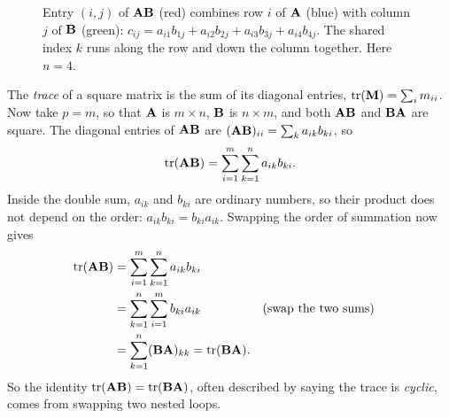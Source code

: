 \begin{figure}[htbp]
\centering
{}
\caption{Entry $(i,j)$ of $\mathbf{A}\mathbf{B}$ (red) combines row $i$ of $\mathbf{A}$ (blue) with column
$j$ of $\mathbf{B}$ (green): $c_{ij} = a_{i1}b_{1j} + a_{i2}b_{2j} + a_{i3}b_{3j} + a_{i4}b_{4j}$. The
shared index $k$ runs along the row and down the column together. Here $n = 4$.}
\label{ch39:fig-matmul}
\end{figure}

The \emph{trace} of a square matrix is the sum of its diagonal entries, $\operatorname{tr}(\mathbf{M}) = \sum_{i}
m_{ii}$. Now take $p = m$, so that $\mathbf{A}$ is $m\times n$, $\mathbf{B}$ is $n\times m$, and both
$\mathbf{A}\mathbf{B}$ and $\mathbf{B}\mathbf{A}$ are square. The diagonal entries of $\mathbf{A}\mathbf{B}$ are
$(\mathbf{A}\mathbf{B})_{ii} = \sum_k a_{ik} b_{ki}$, so
\[
\operatorname{tr}(\mathbf{A}\mathbf{B}) = \sum_{i=1}^m \sum_{k=1}^n a_{ik} b_{ki}.
\]
Inside the double sum, $a_{ik}$ and $b_{ki}$ are ordinary numbers, so their product does not depend
on the order: $a_{ik} b_{ki} = b_{ki} a_{ik}$. Swapping the order of summation now gives
\begin{align*}
\operatorname{tr}(\mathbf{A}\mathbf{B}) &= \sum_{i=1}^m \sum_{k=1}^n a_{ik} b_{ki}\\
&= \sum_{k=1}^n \sum_{i=1}^m b_{ki} a_{ik} && \text{(swap the two sums)}\\
&= \sum_{k=1}^n (\mathbf{B}\mathbf{A})_{kk} = \operatorname{tr}(\mathbf{B}\mathbf{A}).
\end{align*}
So the identity $\operatorname{tr}(\mathbf{A}\mathbf{B}) = \operatorname{tr}(\mathbf{B}\mathbf{A})$, often described by saying the trace is
\emph{cyclic}, comes from swapping two nested loops.

